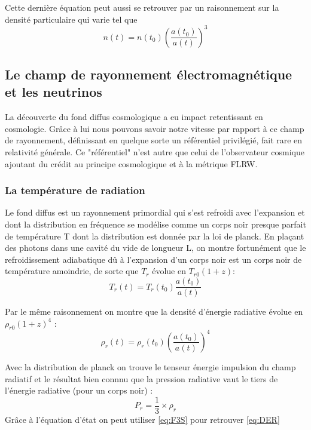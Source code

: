 \documentclass[10pt, a4paper]{report}
\numberwithin{equation}{subsection}
\begin{document}
Cette dernière équation peut aussi se retrouver par un raisonnement sur la densité particulaire qui varie tel que 
\begin{equation} \label{eq:NP}
\boxed{n(t) = n(t_0) \left(\frac{a(t_0)}{a(t)}\right)^3}
\end{equation}

\subsection{Le champ de rayonnement électromagnétique et les neutrinos}
La découverte du fond diffus cosmologique a eu impact retentissant en cosmologie. Grâce à lui nous pouvons savoir notre vitesse par rapport à ce champ de rayonnement, définissant en quelque sorte un référentiel privilégié, fait rare en relativité générale. Ce "référentiel" n'est autre que celui de l'observateur cosmique ajoutant du crédit au principe cosmologique et à la métrique FLRW. 
\subsubsection{La température de radiation}
Le fond diffus est un rayonnement primordial qui s'est refroidi avec l'expansion et dont la distribution en fréquence se modélise comme un corps noir presque parfait de température T dont la distribution est donnée par la loi de planck. En plaçant des photons dans une cavité du vide de longueur L, on montre fortunément que le refroidissement adiabatique dû à l'expansion d'un corps noir est un corps noir de température amoindrie, de sorte que $T_r$ évolue en $T_{r0} (1+z)$:
\begin{equation} \label{eq:TRRA}
\boxed{T_r(t) = T_r(t_0) \frac{a(t_0)}{a(t)}}
\end{equation}

Par le même raisonnement on montre que la densité d'énergie radiative évolue en $\rho_{r0} (1+z)^4$ :
\begin{equation} \label{eq:DER}
\boxed{\rho_r(t) = \rho_r(t_0)  \left({\frac{a(t_0)}{a(t)}}\right)^4}
\end{equation}

Avec la distribution de planck on trouve le tenseur énergie impulsion du champ radiatif et le résultat bien connnu que la pression radiative vaut le tiers de l'énergie radiative (pour un corps noir) :
\begin{equation} \label{eq:EER}
\boxed{P_r = \frac{1}{3} \times \rho_r}
\end{equation}
Grâce à l'équation d'état on peut utiliser \ref{eq:F3S} pour retrouver \ref{eq:DER} 
\end{document}
